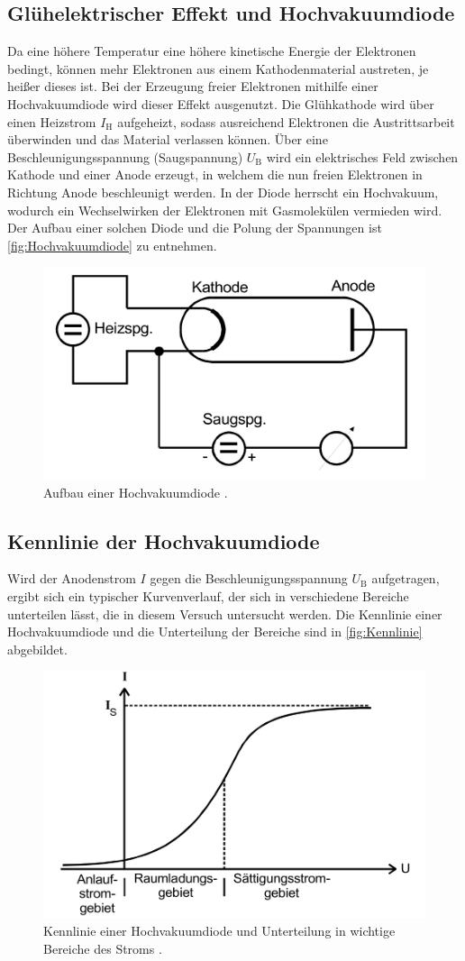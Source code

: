 \subsection{Glühelektrischer Effekt und Hochvakuumdiode}
\label{subsec:Glueelek}
Da eine höhere Temperatur eine höhere kinetische Energie der Elektronen bedingt, können mehr Elektronen aus einem Kathodenmaterial austreten, je heißer dieses ist.
Bei der Erzeugung freier Elektronen mithilfe einer Hochvakuumdiode wird dieser Effekt ausgenutzt. Die Glühkathode wird über einen Heizstrom $I_\text{H}$ aufgeheizt,
sodass ausreichend Elektronen die Austrittsarbeit überwinden und das Material verlassen können. Über eine Beschleunigungsspannung (Saugspannung) $U_\text{B}$
wird ein elektrisches Feld zwischen Kathode und einer Anode erzeugt, in welchem die nun freien Elektronen in Richtung Anode beschleunigt werden. 
In der Diode herrscht ein Hochvakuum, wodurch ein Wechselwirken der Elektronen mit Gasmolekülen vermieden wird.
Der Aufbau einer solchen Diode und die Polung der Spannungen ist \autoref{fig:Hochvakuumdiode} zu entnehmen.
\begin{figure}
    \centering
    \includegraphics[width = .5\textwidth]{content/Vakuumdiode.png}
    \caption{Aufbau einer Hochvakuumdiode \cite{v504}.}
    \label{fig:Hochvakuumdiode}
\end{figure}

\subsection{Kennlinie der Hochvakuumdiode}
\label{subsec:T_Kennlinie}
Wird der Anodenstrom $I$ gegen die Beschleunigungsspannung $U_\text{B}$ aufgetragen, ergibt sich ein typischer Kurvenverlauf, der sich in verschiedene Bereiche 
unterteilen lässt, die in diesem Versuch untersucht werden. Die Kennlinie einer Hochvakuumdiode und die Unterteilung der Bereiche sind in \autoref{fig:Kennlinie} abgebildet.

\begin{figure}
    \centering
    \includegraphics[width = .5\textwidth]{content/Kennlinie.png}
    \caption{Kennlinie einer Hochvakuumdiode und Unterteilung in wichtige Bereiche des Stroms \cite{v504}.}
    \label{fig:Kennlinie}
\end{figure}

